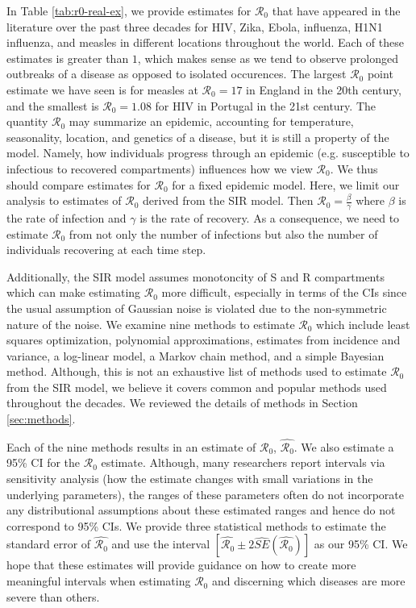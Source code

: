 \documentclass[12pt]{article}
\newcommand{\wxxsir}{nine } %
\newcommand{\rr}{\ensuremath{\mathcal{R}_0}}
\begin{document}
In Table \ref{tab:r0-real-ex}, we provide estimates for $\rr$ that have appeared in the literature over the past three decades for HIV, Zika, Ebola, influenza, H1N1 influenza, and measles in different locations throughout the world.  Each of these estimates is greater than $1$, which makes sense as we tend to observe prolonged outbreaks of a disease as opposed to isolated occurences.  The largest $\rr$ point estimate we have seen is for measles at $\rr=17$ in England in the 20th century, and the smallest is $\rr=1.08$ for HIV in Portugal in the 21st century.
The quantity $\rr$ may summarize an epidemic, accounting for temperature, seasonality, location, and genetics of a disease, but it is still a property of the model.  Namely, how individuals progress through an epidemic (e.g. susceptible to infectious to recovered compartments) influences how we view $\rr$.  We thus should compare estimates for $\rr$ for a fixed epidemic model.  Here, we limit our analysis to estimates of $\rr$ derived from the SIR model.  Then $\rr = \frac{\beta}{\gamma}$ where $\beta$ is the rate of infection and $\gamma$ is the rate of recovery.  As a consequence, we need to estimate $\rr$ from not only the number of infections but also the number of individuals recovering at each time step.


Additionally, the SIR model assumes monotoncity of S and R compartments which can make estimating $\rr$ more difficult, especially in terms of the CIs since the usual assumption of Gaussian noise is violated due to the non-symmetric nature of the noise.  We examine \wxxsir methods to estimate $\rr$ which include least squares optimization, polynomial approximations, estimates from incidence and variance, a log-linear model, a Markov chain method, and a simple Bayesian method.  Although, this is not an exhaustive list of methods used to estimate $\rr$ from the SIR model, we believe it covers common and popular methods used throughout the decades.  We reviewed the details of methods in Section \ref{sec:methods}.

Each of the \wxxsir methods results in an estimate of $\rr$, $\hat{\rr}$.  We also estimate a 95\% CI for the  $\rr$ estimate.  Although, many researchers report intervals via sensitivity analysis (how the estimate changes with small variations in the underlying parameters), the ranges of these parameters often do not incorporate any distributional assumptions about these estimated ranges and hence do not correspond to 95\% CIs.  We provide three statistical methods to estimate the standard error of $\hat{\rr}$ and use the interval $\left [\hat{\rr} \pm 2\hat{SE}\left (\hat{\rr} \right ) \right ]$ as our 95\% CI.  We hope that these estimates will provide guidance on how to create more meaningful intervals when estimating $\rr$ and discerning which diseases are more severe than others.
\end{document}
